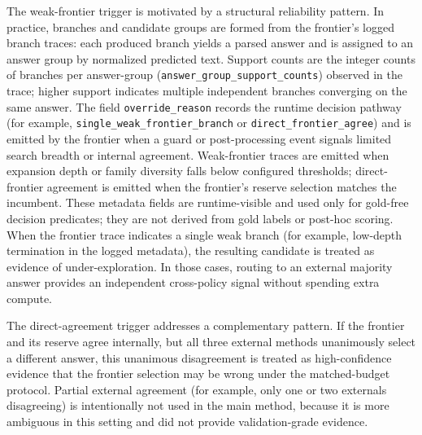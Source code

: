The weak-frontier trigger is motivated by a structural reliability pattern. In practice, branches and candidate groups are formed from the frontier's logged branch traces: each produced branch yields a parsed answer and is assigned to an answer group by normalized predicted text. Support counts are the integer counts of branches per answer-group (\texttt{answer\_group\_support\_counts}) observed in the trace; higher support indicates multiple independent branches converging on the same answer. The field \texttt{override\_reason} records the runtime decision pathway (for example, \texttt{single\_weak\_frontier\_branch} or \texttt{direct\_frontier\_agree}) and is emitted by the frontier when a guard or post-processing event signals limited search breadth or internal agreement. Weak-frontier traces are emitted when expansion depth or family diversity falls below configured thresholds; direct-frontier agreement is emitted when the frontier's reserve selection matches the incumbent. These metadata fields are runtime-visible and used only for gold-free decision predicates; they are not derived from gold labels or post-hoc scoring.
When the frontier trace indicates a single weak branch (for example, low-depth
termination in the logged metadata), the resulting candidate is treated as
evidence of under-exploration.
In those cases, routing to an external majority answer provides an independent
cross-policy signal without spending extra compute.

The direct-agreement trigger addresses a complementary pattern.
If the frontier and its reserve agree internally, but all three external methods
unanimously select a different answer, this unanimous disagreement is treated as
high-confidence evidence that the frontier selection may be wrong under the
matched-budget protocol.
Partial external agreement (for example, only one or two externals disagreeing)
is intentionally not used in the main method, because it is more ambiguous in
this setting and did not provide validation-grade evidence.

